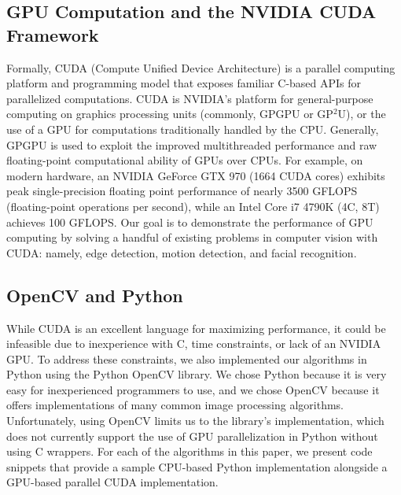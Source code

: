 \documentclass[journal]{IEEEtran}
\begin{document}
\subsection{GPU Computation and the NVIDIA CUDA Framework}
Formally, CUDA (Compute Unified Device Architecture) is a parallel computing platform and programming model that exposes familiar C-based APIs for parallelized computations. CUDA is NVIDIA's platform for general-purpose computing on graphics processing units (commonly, GPGPU or GP$^2$U), or the use of a GPU for computations traditionally handled by the CPU. Generally, GPGPU is used to exploit the improved multithreaded performance and raw floating-point computational ability of GPUs over CPUs. For example, on modern hardware, an NVIDIA GeForce GTX 970 (1664 CUDA cores) exhibits peak single-precision floating point performance of nearly 3500 GFLOPS (floating-point operations per second), while an Intel Core i7 4790K (4C, 8T) achieves 100 GFLOPS. Our goal is to demonstrate the performance of GPU computing by solving a handful of existing problems in computer vision with CUDA: namely, edge detection, motion detection, and facial recognition.

\subsection{OpenCV and Python}
While CUDA is an excellent language for maximizing performance, it could be infeasible due to inexperience with C, time constraints, or lack of an NVIDIA GPU. To address these constraints, we also implemented our algorithms in Python using the Python OpenCV library. We chose Python because it is very easy for inexperienced programmers to use, and we chose OpenCV because it offers implementations of many common image processing algorithms. Unfortunately, using OpenCV limits us to the library's implementation, which does not currently support the use of GPU parallelization in Python without using C wrappers. For each of the algorithms in this paper, we present code snippets that provide a sample CPU-based Python implementation alongside a GPU-based parallel CUDA implementation.
\end{document}
